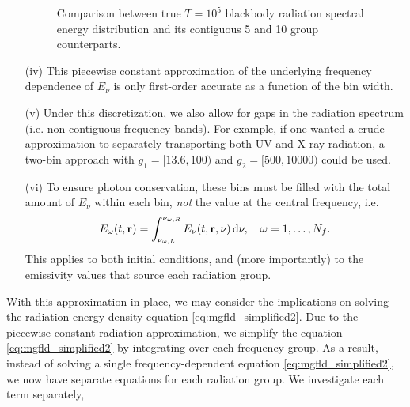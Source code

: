 \documentclass[10pt]{article}
\renewcommand{\(}{\left(}
\renewcommand{\)}{\right)}
\newcommand{\rvec}{{\bf r}}
\newcommand{\Enu}{E_{\nu}}
\begin{document}
\begin{itemize}
\begin{figure}[h]
{      \hfill}
    \caption{Comparison between true $T=10^5$ blackbody radiation
      spectral energy distribution and its contiguous 5 and 10 group
      counterparts.}  
    \label{fig:binned_blackbody}
  \end{figure}

\item[(iv)] This piecewise constant approximation of the underlying
  frequency dependence of $\Enu$ is only first-order accurate as a
  function of the bin width.

\item[(v)] Under this discretization, we also allow for gaps in the
  radiation spectrum (i.e. non-contiguous frequency bands).  For
  example, if one wanted a crude approximation to separately
  transporting both UV and X-ray radiation, a two-bin approach with
  $g_1 = [13.6,100)$ and $g_2 = [500,10000)$ could be used.

\item[(vi)] To ensure photon conservation, these bins must be filled
  with the total amount of $\Enu$ within each bin, {\em not} the
  value at the central frequency, i.e.
  \[
     E_{\omega}(t,\rvec) = \int_{\nu_{\omega,L}}^{\nu_{\omega,R}}
     \Enu(t,\rvec,\nu)\,\mathrm d\nu, \quad \omega=1,\ldots,N_f.
  \]
  This applies to both initial conditions, and (more importantly) to
  the emissivity values that source each radiation group.

\end{itemize}
With this approximation in place, we may consider the implications on
solving the radiation energy density equation
\eqref{eq:mgfld_simplified2}.  Due to the piecewise constant
radiation approximation, we simplify the equation
\eqref{eq:mgfld_simplified2} by integrating over each frequency
group.  As a result, instead of solving a single frequency-dependent equation
\eqref{eq:mgfld_simplified2}, we now have separate equations for each
radiation group. We investigate each term separately,
\end{document}
